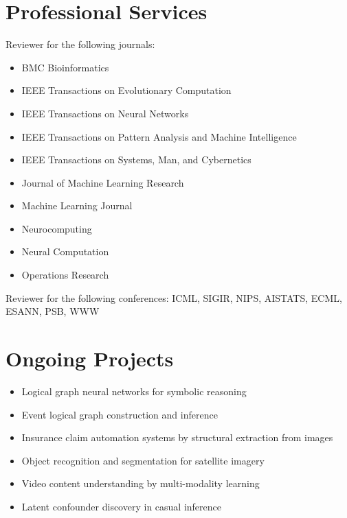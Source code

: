 \documentclass[line,10pt,final]{res}
\begin{document}
\begin{resume}
{}

\section{\sc Professional Services}

Reviewer for the following journals: 

\begin{itemize}
\item BMC Bioinformatics
\item IEEE Transactions on Evolutionary Computation
\item IEEE Transactions on Neural Networks
\item IEEE Transactions on Pattern Analysis and Machine Intelligence
\item IEEE Transactions on Systems, Man, and Cybernetics
\item Journal of Machine Learning Research 
\item Machine Learning Journal
\item Neurocomputing 
\item Neural Computation 
\item Operations Research
\end{itemize}

Reviewer for the following conferences: ICML, SIGIR, NIPS, AISTATS, ECML, ESANN, PSB, WWW



\section{\sc Ongoing Projects}

\begin{itemize}
  \item Logical graph neural networks for symbolic reasoning
  \item Event logical graph construction and inference
  \item Insurance claim automation systems by structural extraction from images
  \item Object recognition and segmentation for satellite imagery
  \item Video content understanding by multi-modality learning
  \item Latent confounder discovery in casual inference
  \end{itemize}



\end{resume}
\end{document}
